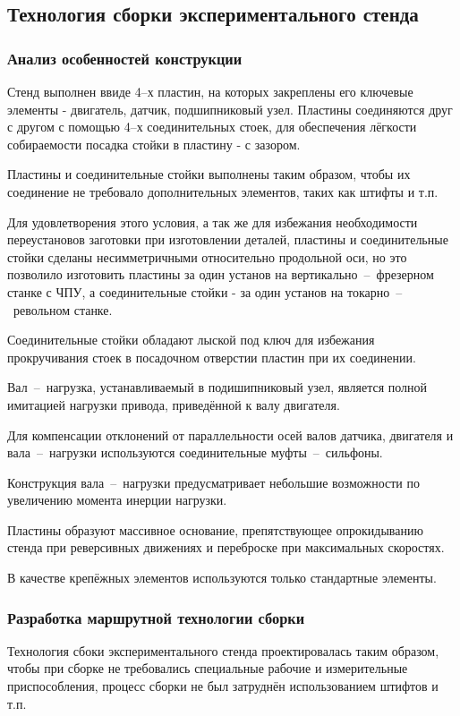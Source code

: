 \newpage
\subsection{Технология сборки экспериментального стенда}
\subsubsection{Анализ особенностей конструкции}

Стенд выполнен ввиде 4--х пластин, на которых закреплены его ключевые элементы -
двигатель, датчик, подшипниковый узел. Пластины соединяются друг с другом с помощью
4--х соединительных стоек, для обеспечения лёгкости собираемости посадка стойки в
пластину - с зазором.

Пластины и соединительные стойки выполнены таким образом, чтобы их соединение
не требовало дополнительных элементов, таких как штифты и т.п.

Для удовлетворения этого условия, а так же для избежания необходимости
переустановов заготовки при изготовлении деталей, пластины и соединительные стойки
сделаны несимметричными относительно продольной оси, но это позволило изготовить
пластины за один установ на вертикально~--~фрезерном станке с ЧПУ, а соединительные
стойки - за один установ на токарно~--~револьном станке.

Соединительные стойки обладают лыской под ключ для избежания прокручивания стоек
в посадочном отверстии пластин при их соединении.

Вал~--~нагрузка, устанавливаемый в подишипниковый узел, является полной имитацией
нагрузки привода, приведённой к валу двигателя.

Для компенсации отклонений от параллельности осей валов датчика, двигателя и
вала~--~нагрузки используются соединительные муфты~--~сильфоны.

Конструкция вала~--~нагрузки предусматривает небольшие возможности по увеличению
момента инерции нагрузки.

Пластины образуют массивное основание, препятствующее опрокидыванию стенда
при реверсивных движениях и переброске при максимальных скоростях.

В качестве крепёжных элементов используются только стандартные элементы.

\subsubsection{Разработка маршрутной технологии сборки}

Технология сбоки экспериментального стенда проектировалась таким образом,
чтобы при сборке не требовались специальные рабочие и измерительные приспособления,
процесс сборки не был затруднён использованием штифтов и т.п.
